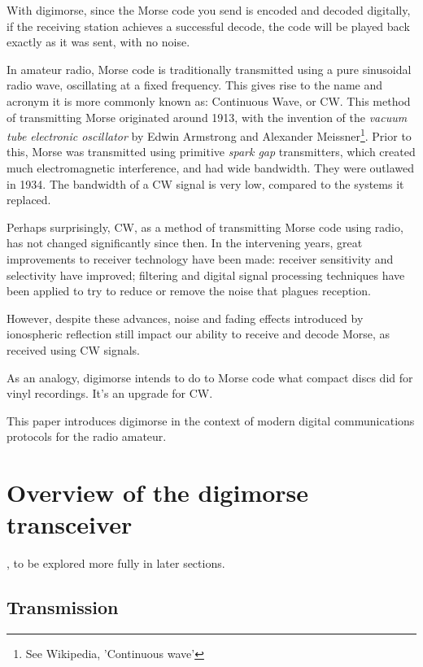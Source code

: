 \documentclass[a4paper]{tufte-handout}
\begin{document}
    With digimorse, since the Morse code you send is encoded and decoded digitally, if the receiving station
    achieves a successful decode, the code will be played back exactly as it was sent, with no noise.

    In amateur radio, Morse code is traditionally transmitted using a pure sinusoidal radio wave, oscillating at a
    fixed frequency. This gives rise to the name and acronym it is more commonly known as: Continuous Wave, or CW.
    This method of transmitting Morse originated around 1913, with the invention of the \emph{vacuum tube electronic
    oscillator} by Edwin Armstrong and Alexander Meissner\footnote{See Wikipedia, 'Continuous wave'}. Prior to this,
    Morse was transmitted using primitive \emph{spark gap} transmitters, which created much electromagnetic
    interference, and had wide bandwidth. They were outlawed in 1934. The bandwidth of a CW signal is very low,
    compared to the systems it replaced\cite{Amos}.

    Perhaps surprisingly, CW, as a method of transmitting Morse code
    using radio, has not changed significantly since then. In the intervening years, great improvements to receiver
    technology have been made: receiver sensitivity and selectivity have improved; filtering and digital signal
    processing techniques have been applied to try to reduce or remove the noise that plagues reception.

    However, despite these advances, noise and fading effects introduced by ionospheric reflection still impact our
    ability to receive and decode Morse, as received using CW signals.

    As an analogy, digimorse intends to do to Morse code what compact discs did for vinyl recordings. It's an upgrade
    for CW.

    This paper introduces digimorse in the context of modern digital communications protocols for the radio amateur.

    \pagebreak
    \tableofcontents
    \pagebreak

\section{Overview of the digimorse transceiver}
    , to be explored more fully in later sections.

\subsection{Transmission}
\end{document}
